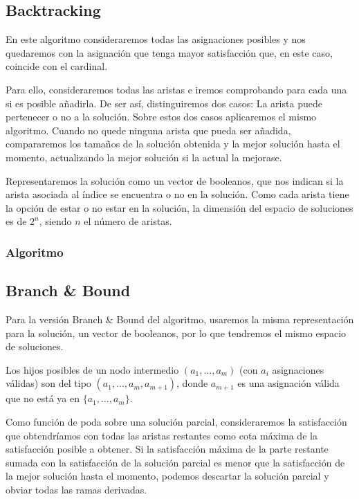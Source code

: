 \documentclass[a4paper, 11pt]{article} %
\begin{document}
        \subsection{Backtracking}
	  En este algoritmo consideraremos todas las asignaciones posibles y nos quedaremos con la asignación que tenga mayor satisfacción
	  que, en este caso, coincide con el cardinal.
	  
	  Para ello, consideraremos todas las aristas e iremos comprobando para cada una si es posible añadirla. De ser así, distinguiremos dos
	  casos: La arista puede pertenecer o no a la solución. Sobre estos dos casos aplicaremos el mismo algoritmo. Cuando no quede ninguna
	  arista que pueda ser añadida, compararemos los tamaños de la solución obtenida y la mejor solución hasta el momento, actualizando
	  la mejor solución si la actual la mejorase. 
	  
	  Representaremos la solución como un vector de booleanos, que nos indican si la arista asociada al índice se encuentra o 
	  no en la solución. Como cada arista tiene la opción de estar o no estar en la solución, la dimensión del espacio de 
	  soluciones es de $2^n$, siendo $n$ el número de aristas.
	  
	  \subsubsection{Algoritmo}
	    \small
	    \texttt{}
	    \normalsize
	  
        \subsection{Branch \& Bound}
	  Para la versión Branch \& Bound del algoritmo, usaremos la misma representación para la solución, 
	  un vector de booleanos, por lo que tendremos el mismo espacio de soluciones.
	  
	  Los hijos posibles de un nodo intermedio $(a_1, \dots, a_m)$ (con $a_i$ asignaciones válidas) son del tipo 
	  $(a_1, \dots, a_m, a_{m+1})$, donde $a_{m+1}$ es una asignación válida que no está ya en $\{a_1, \dots, a_m\}$.
	  
	  Como función de poda sobre una solución parcial, consideraremos la satisfacción que obtendríamos con todas 
	  las aristas restantes como cota máxima de la satisfacción posible a obtener. Si la satisfacción máxima de 
	  la parte restante sumada con la satisfacción de la solución parcial es menor que la satisfacción de la mejor 
	  solución hasta el momento, podemos descartar la solución parcial y obviar todas las ramas derivadas. 
	  
\end{document}
